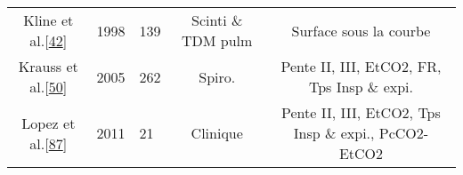 \documentclass[12pt,]{article}
\begin{document}
\begin{landscape}
\begin{longtable}[]{@{}cllcc@{}}
\begin{minipage}[t]{0.31\columnwidth}
Kline et al.{[}\protect\hyperlink{ref-kline1998preliminary}{42}{]}\strut
\end{minipage} & \begin{minipage}[t]{0.05\columnwidth}\raggedright
1998\strut
\end{minipage} & \begin{minipage}[t]{0.06\columnwidth}\raggedright
139\strut
\end{minipage} & \begin{minipage}[t]{0.12\columnwidth}\centering
Scinti \& TDM pulm\strut
\end{minipage} & \begin{minipage}[t]{0.32\columnwidth}\centering
Surface sous la courbe\strut
\end{minipage}\tabularnewline
\begin{minipage}[t]{0.31\columnwidth}\centering
Krauss et al.{[}\protect\hyperlink{ref-krauss2005capnogram}{50}{]}\strut
\end{minipage} & \begin{minipage}[t]{0.05\columnwidth}\raggedright
2005\strut
\end{minipage} & \begin{minipage}[t]{0.06\columnwidth}\raggedright
262\strut
\end{minipage} & \begin{minipage}[t]{0.12\columnwidth}\centering
Spiro.\strut
\end{minipage} & \begin{minipage}[t]{0.32\columnwidth}\centering
Pente II, III, EtCO2, FR, Tps Insp \& expi.\strut
\end{minipage}\tabularnewline
\begin{minipage}[t]{0.31\columnwidth}\centering
Lopez et al.{[}\protect\hyperlink{ref-lopez2011capnography}{87}{]}\strut
\end{minipage} & \begin{minipage}[t]{0.05\columnwidth}\raggedright
2011\strut
\end{minipage} & \begin{minipage}[t]{0.06\columnwidth}\raggedright
21\strut
\end{minipage} & \begin{minipage}[t]{0.12\columnwidth}\centering
Clinique\strut
\end{minipage} & \begin{minipage}[t]{0.32\columnwidth}\centering
Pente II, III, EtCO2, Tps Insp \& expi., PcCO2-EtCO2\strut
\end{minipage}\tabularnewline

\end{longtable}
\end{landscape}
\end{document}
